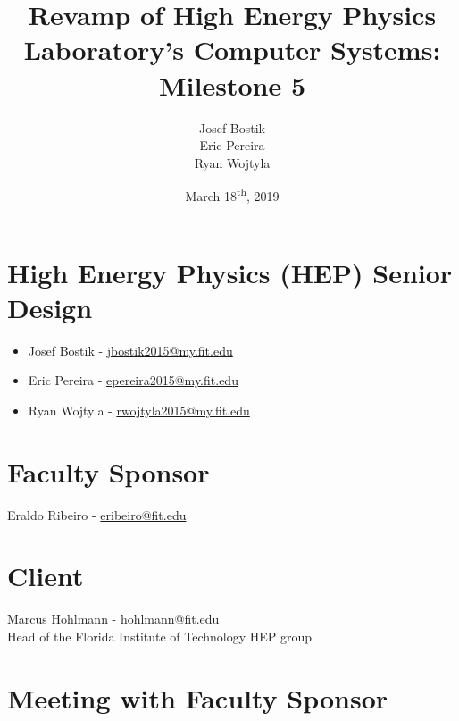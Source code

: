 \documentclass[12pt]{article}
\newcommand\tab[1][1cm]{\hspace*{#1}}
\begin{document}
	

\begin{titlepage}
	
\author{Josef Bostik\\
	Eric Pereira\\
	Ryan Wojtyla\\}
\date{March 18\textsuperscript{th}, 2019}
\title{Revamp of High Energy Physics Laboratory's Computer Systems: Milestone 5}

\maketitle

\end{titlepage}

\tableofcontents

\newpage {}

\section{High Energy Physics (HEP) Senior Design}

\begin{itemize}
	\item Josef Bostik - \href{mailto:jbostik2015@my.fit.edu}{jbostik2015@my.fit.edu}
	\item Eric Pereira - \href{mailto:epereira2015@my.fit.edu}{epereira2015@my.fit.edu}
	\item Ryan Wojtyla - \href{mailto:rwojtyla2015@my.fit.edu}{rwojtyla2015@my.fit.edu}
\end{itemize}

\section{Faculty Sponsor}

\tab Eraldo Ribeiro - \href{mailto:eribeiro@fit.edu}{eribeiro@fit.edu}

\section{Client}

\tab Marcus Hohlmann - \href{mailto:hohlmann@fit.edu}{hohlmann@fit.edu} \\ 
\tab Head of the Florida Institute of Technology HEP group

\section{Meeting with Faculty Sponsor}
\end{document}
